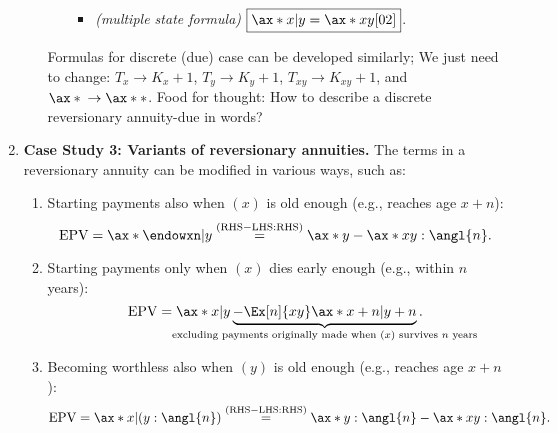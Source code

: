 \begin{enumerate}
\begin{enumerate}[label={(\arabic*)}]
\begin{itemize}
\begin{itemize}
\item \emph{(multiple state formula)} \(\boxed{\ax*{x|y}=\ax*{xy}[02]}\).
 \end{itemize}
\end{itemize}
\begin{center}
\end{center}
\begin{note}
Formulas for discrete (due) case can be developed similarly; We just need to
change: \(T_x\to K_x+1\), \(T_y\to K_y+1\), \(T_{xy}\to K_{xy}+1\),
and \(\ax*{}\to\ax**{}\). Food for thought: How to describe a discrete
reversionary annuity-due in words?
\end{note}
\end{enumerate}
\item \textbf{Case Study 3: Variants of reversionary annuities.}
The terms in a reversionary annuity can be modified in various ways, such as:
\begin{enumerate}[label={(\arabic*)}]
\item Starting payments also when \((x)\) is old enough (e.g., reaches age \(x+n\)):
\[
\text{EPV}=\ax*{\endowxn|y}\overset{(\text{RHS}-\text{LHS:RHS})}{=}\ax*{y}-\ax*{xy:\angl{n}}.
\]
\item Starting payments only when \((x)\) dies early enough (e.g., within \(n\) years):
\[
\text{EPV}=\ax*{x|y}\underbrace{-\Ex[n]{xy}\ax*{x+n|y+n}}_{\mathclap{\text{
excluding payments originally made when \((x)\) survives \(n\) years
}}}.
\]
\item Becoming worthless also when \((y)\) is old enough (e.g., reaches age \(x+n\)):
\[
\text{EPV}=\ax*{x|(y:\angl{n})}\overset{(\text{RHS}-\text{LHS:RHS})}{=}\ax*{y:\angl{n}}-\ax*{xy:\angl{n}}.
\]
\end{enumerate}
\end{enumerate}
